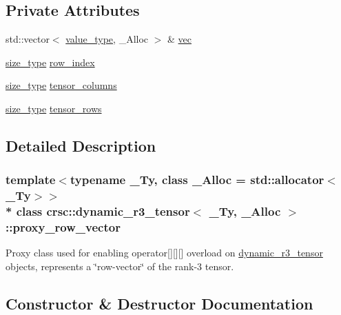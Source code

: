 \subsection*{Private Attributes}
\begin{DoxyCompactItemize}
\item 
std\+::vector$<$ \hyperlink{classcrsc_1_1dynamic__r3__tensor_ad7fb44388c819fb7947771da18bb625b}{value\+\_\+type}, \+\_\+\+Alloc $>$ \& \hyperlink{classcrsc_1_1dynamic__r3__tensor_1_1proxy__row__vector_a18cf96be074c31c45fd2dfbeb3a2272c}{vec}
\item 
\hyperlink{classcrsc_1_1dynamic__r3__tensor_a00e5f1f46f16d0c0ac1cffa6bd0fe862}{size\+\_\+type} \hyperlink{classcrsc_1_1dynamic__r3__tensor_1_1proxy__row__vector_a508eb3a7acbd9ddca465ba7ad2e34685}{row\+\_\+index}
\item 
\hyperlink{classcrsc_1_1dynamic__r3__tensor_a00e5f1f46f16d0c0ac1cffa6bd0fe862}{size\+\_\+type} \hyperlink{classcrsc_1_1dynamic__r3__tensor_1_1proxy__row__vector_a0ff8c44a0376eea59253906d46289e9f}{tensor\+\_\+columns}
\item 
\hyperlink{classcrsc_1_1dynamic__r3__tensor_a00e5f1f46f16d0c0ac1cffa6bd0fe862}{size\+\_\+type} \hyperlink{classcrsc_1_1dynamic__r3__tensor_1_1proxy__row__vector_a4bf508334382de7c48a7e5d8079adf4c}{tensor\+\_\+rows}
\end{DoxyCompactItemize}


\subsection{Detailed Description}
\subsubsection*{template$<$typename \+\_\+\+Ty, class \+\_\+\+Alloc = std\+::allocator$<$\+\_\+\+Ty$>$$>$\\*
class crsc\+::dynamic\+\_\+r3\+\_\+tensor$<$ \+\_\+\+Ty, \+\_\+\+Alloc $>$\+::proxy\+\_\+row\+\_\+vector}

Proxy class used for enabling operator\mbox{[}\mbox{]}\mbox{[}\mbox{]}\mbox{[}\mbox{]} overload on \hyperlink{classcrsc_1_1dynamic__r3__tensor}{dynamic\+\_\+r3\+\_\+tensor} objects, represents a \char`\"{}row-\/vector\char`\"{} of the rank-\/3 tensor. 

\subsection{Constructor \& Destructor Documentation}
